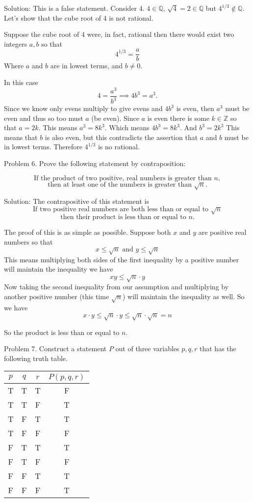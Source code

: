 \documentclass[16 pt]{amsart}
\theoremstyle{definition}
\theoremstyle{remark}
\numberwithin{equation}{subsection}
\newcommand{\Z}{\mathbb{Z}}
\newcommand{\Q}{\mathbb{Q}}
\begin{document}
Solution: This is a false statement.  Consider 4.  $4\in\Q$, $\sqrt{4} = 2\in\Q$ but $4^{1/3}\notin \Q$. 
Let's show that the cube root of 4 is not rational.

Suppose the cube root of 4 were, in fact, rational then there would exist two integers $a,b$ so that 
\[
4^{1/3} = \frac{a}{b}
\]
Where $a$ and $b$ are in lowest terms, and $b\ne 0$.

In this case
\[
4 = \frac{a^3}{b^3} \implies 4b^3 = a^3.
\]  
Since we know only evens multiply to give evens and $4b^3$ is even, then $a^3$ must be even and thus so too must $a$ (be even).
Since $a$ is even there is some $k\in\Z$ so that $a=2k$.  This means $a^3 = 8k^3$.   Which means $4b^3 = 8k^3.$ And $b^3 = 2k^3$  This means that $b$ is also even, but this contradicts the assertion that $a$ and $b$ must be in lowest terms.  Therefore $4^{1/3}$ is no rational.



\newpage

Problem 6. Prove the following statement by contraposition:

\[
\text{If the product of two positive, real numbers is greater than } n,
\]
\[
\text{then at least one of the numbers is greater than } \sqrt{n}.
\]

\vspace{1in}

Solution: The contrapositive of this statement is
\[
\text{If two positive real numbers are both less than or equal to } \sqrt{n}
\]
\[
\text{then their product is less than or equal to } n.
\]

The proof of this is as simple as possible.  Suppose both $x$ and $y$ are positive real numbers so that
\[
x \le \sqrt{n} \text{ and } y\le \sqrt{n}
\]
This means multiplying both sides of the first inequality by a positive number will maintain the inequality we have
\[
xy \le \sqrt{n} \cdot y
\]
Now taking the second inequality from our assumption and multiplying by another positive number (this time $\sqrt{n}$) will maintain the inequality as well.  So we have
\[
x\cdot y \le \sqrt{n} \cdot y \le \sqrt{n}\cdot\sqrt{n} = n
\]

So the product is less than or equal to $n$.

\newpage

Problem 7. Construct a statement $P$ out of three variables $p,q,r$ that has the following truth table.

\begin{center}

\begin{tabular}{c|c|c|c}
$p$ & $q$ & $r$ & $P(p,q,r)$\\
\hline
T & T & T & F \\
T & T & F & T \\
T & F & T & T \\
T & F & F & F \\
F & T & T & T \\
F & T & F & F \\
F & F & T & T \\
F & F & F & T \\
\end{tabular}

\end{center}
\end{document}
